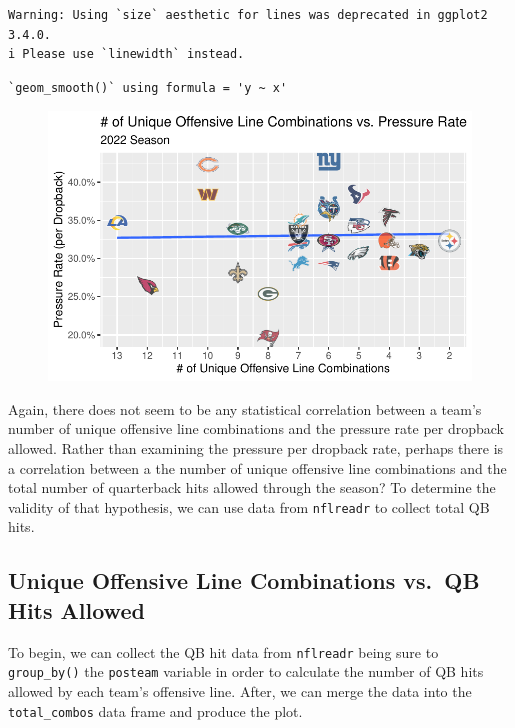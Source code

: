 \documentclass[
  letterpaper,
]{krantz}
\begin{document}
\begin{verbatim}
Warning: Using `size` aesthetic for lines was deprecated in ggplot2 3.4.0.
i Please use `linewidth` instead.
\end{verbatim}

\begin{verbatim}
`geom_smooth()` using formula = 'y ~ x'
\end{verbatim}

\begin{figure}[H]

{\centering \includegraphics{01-nfl-analytics-and-r_files/figure-pdf/plot-pressure-rate-1.pdf}

}

\end{figure}

Again, there does not seem to be any statistical correlation between a
team's number of unique offensive line combinations and the pressure
rate per dropback allowed. Rather than examining the pressure per
dropback rate, perhaps there is a correlation between a the number of
unique offensive line combinations and the total number of quarterback
hits allowed through the season? To determine the validity of that
hypothesis, we can use data from \texttt{nflreadr} to collect total QB
hits.

\hypertarget{unique-offensive-line-combinations-vs.-qb-hits-allowed}{%
\subsection{Unique Offensive Line Combinations vs.~QB Hits
Allowed}\label{unique-offensive-line-combinations-vs.-qb-hits-allowed}}

To begin, we can collect the QB hit data from \texttt{nflreadr} being
sure to \texttt{group\_by()} the \texttt{posteam} variable in order to
calculate the number of QB hits allowed by each team's offensive line.
After, we can merge the data into the \texttt{total\_combos} data frame
and produce the plot.
\end{document}
